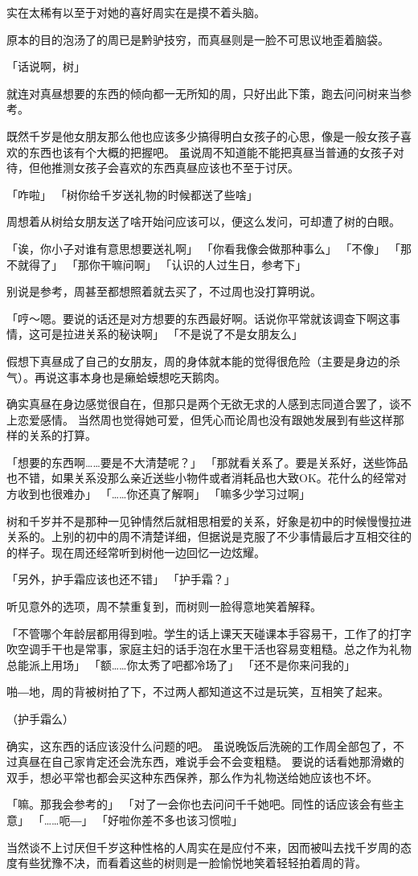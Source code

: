 实在太稀有以至于对她的喜好周实在是摸不着头脑。

原本的目的泡汤了的周已是黔驴技穷，而真昼则是一脸不可思议地歪着脑袋。


「话说啊，树」

就连对真昼想要的东西的倾向都一无所知的周，只好出此下策，跑去问问树来当参考。

既然千岁是他女朋友那么他也应该多少搞得明白女孩子的心思，像是一般女孩子喜欢的东西也该有个大概的把握吧。
虽说周不知道能不能把真昼当普通的女孩子对待，但他推测女孩子会喜欢的东西真昼应该也不至于讨厌。

「咋啦」
「树你给千岁送礼物的时候都送了些啥」

周想着从树给女朋友送了啥开始问应该可以，便这么发问，可却遭了树的白眼。

「诶，你小子对谁有意思想要送礼啊」
「你看我像会做那种事么」
「不像」
「那不就得了」
「那你干嘛问啊」
「认识的人过生日，参考下」

别说是参考，周甚至都想照着就去买了，不过周也没打算明说。

「哼～嗯。要说的话还是对方想要的东西最好啊。话说你平常就该调查下啊这事情，这可是拉进关系的秘诀啊」
「不是说了不是女朋友么」

假想下真昼成了自己的女朋友，周的身体就本能的觉得很危险（主要是身边的杀气）。再说这事本身也是癞蛤蟆想吃天鹅肉。

确实真昼在身边感觉很自在，但那只是两个无欲无求的人感到志同道合罢了，谈不上恋爱感情。
当然周也觉得她可爱，但凭心而论周也没有跟她发展到有些这样那样的关系的打算。

「想要的东西啊……要是不大清楚呢？」
「那就看关系了。要是关系好，送些饰品也不错，如果关系没那么亲近送些小物件或者消耗品也大致OK。花什么的经常对方收到也很难办」
「……你还真了解啊」
「嘛多少学习过啊」

树和千岁并不是那种一见钟情然后就相思相爱的关系，好象是初中的时候慢慢拉进关系的。上别的初中的周不清楚详细，但据说是克服了不少事情最后才互相交往的的样子。现在周还经常听到树他一边回忆一边炫耀。

「另外，护手霜应该也还不错」
「护手霜？」

听见意外的选项，周不禁重复到，而树则一脸得意地笑着解释。

「不管哪个年龄层都用得到啦。学生的话上课天天碰课本手容易干，工作了的打字吹空调手干也是常事，家庭主妇的话手泡在水里干活也容易变粗糙。总之作为礼物总能派上用场」
「额……你太秀了吧都冷场了」
「还不是你来问我的」

啪―地，周的背被树拍了下，不过两人都知道这不过是玩笑，互相笑了起来。

（护手霜么）

确实，这东西的话应该没什么问题的吧。
虽说晚饭后洗碗的工作周全部包了，不过真昼在自己家肯定还会洗东西，难说手会不会变粗糙。
要说的话看她那滑嫩的双手，想必平常也都会买这种东西保养，那么作为礼物送给她应该也不坏。

「嘛。那我会参考的」
「对了一会你也去问问千千她吧。同性的话应该会有些主意」
「……呃―」
「好啦你差不多也该习惯啦」

当然谈不上讨厌但千岁这种性格的人周实在是应付不来，因而被叫去找千岁周的态度有些犹豫不决，而看着这些的树则是一脸愉悦地笑着轻轻拍着周的背。
